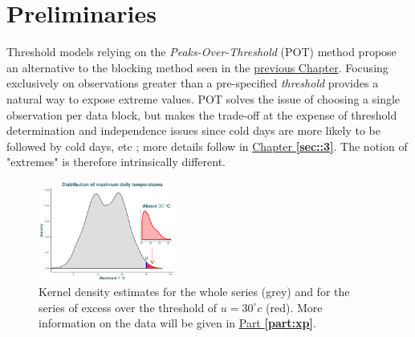 
\section{Preliminaries}\label{sec::2.1}

Threshold models relying on the \emph{Peaks-Over-Threshold} (POT) method propose an alternative to the blocking method seen in the \hyperref[sec::1]{previous Chapter}. Focusing exclusively on observations greater than a pre-specified \emph{threshold} provides a natural way to expose extreme values. POT solves the issue of choosing a single observation per data block, but makes the trade-off at the expense of threshold determination and independence issues since cold days are more likely to be followed by cold days, etc ; more details follow in \hyperref[sec::3]{Chapter \textbf{\ref{sec::3}}}. The notion of "extremes" is therefore intrinsically different.


\begin{figure}
	\centering
	\includegraphics[width=0.4\textwidth]{pot_plot.pdf} %
	\caption{Kernel density estimates for the whole series (grey) and for the series of excess over the threshold of $u=30^{\circ} c$ (red). More information on the data will be given in \hyperref[part:xp]{Part \textbf{\ref{part:xp}}}.}
	\label{fig:pot_plot}
\end{figure}

